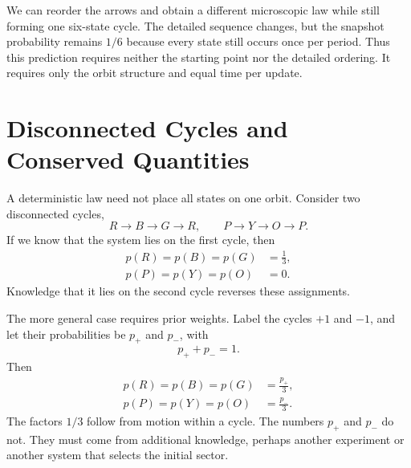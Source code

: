 We can reorder the arrows and obtain a different microscopic law while still
forming one six-state cycle. The detailed sequence changes, but the snapshot
probability remains \(1/6\) because every state still occurs once per period.
Thus this prediction requires neither the starting point nor the detailed
ordering. It requires only the orbit structure and equal time per update.

\begin{classroomqa}
\end{classroomqa}

\section{Disconnected Cycles and Conserved Quantities}

A deterministic law need not place all states on one orbit. Consider two
disconnected cycles,
\begin{equation}
 R\longrightarrow B\longrightarrow G\longrightarrow R,
 \qquad
 P\longrightarrow Y\longrightarrow O\longrightarrow P.
 \label{eq:sm1-two-cycles}
\end{equation}
If we know that the system lies on the first cycle, then
\begin{equation}
 \begin{aligned}
 p(R)=p(B)=p(G)&=\frac13,\\
 p(P)=p(Y)=p(O)&=0.
 \end{aligned}
\end{equation}
Knowledge that it lies on the second cycle reverses these assignments.

The more general case requires prior weights. Label the cycles \(+1\) and
\(-1\), and let their probabilities be \(p_+\) and \(p_-\), with
\begin{equation}
 p_++p_-=1.
\end{equation}
Then
\begin{align}
 p(R)=p(B)=p(G)&=\frac{p_+}{3},\\
 p(P)=p(Y)=p(O)&=\frac{p_-}{3}.
 \label{eq:sm1-sector-weights}
\end{align}
The factors \(1/3\) follow from motion within a cycle. The numbers \(p_+\)
and \(p_-\) do not. They must come from additional knowledge, perhaps another
experiment or another system that selects the initial sector.

